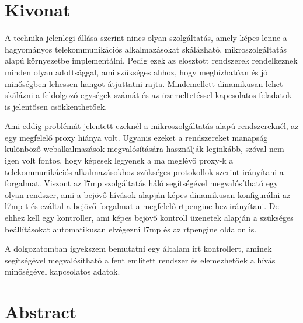 \setcounter{page}{1}

\selecthungarian

\chapter*{Kivonat}

A technika jelenlegi állása szerint nincs olyan szolgáltatás, amely képes lenne a hagyományos telekommunikációs alkalmazásokat skálázható, mikroszolgáltatás alapú környezetbe implementálni. Pedig ezek az elosztott rendszerek rendelkeznek minden olyan adottsággal, ami szükséges ahhoz, hogy megbízhatóan és jó minőségben lehessen hangot átjuttatni rajta. Mindemellett dinamikusan lehet skálázni a feldolgozó egységek számát és az üzemeltetéssel kapcsolatos feladatok is jelentősen csökkenthetőek.

Ami eddig problémát jelentett ezeknél a mikroszolgáltatás alapú rendszereknél, az egy megfelelő proxy hiánya volt. Ugyanis ezeket a rendszereket manapság különböző webalkalmazások megvalósítására használják leginkább, szóval nem igen volt fontos, hogy képesek legyenek a ma meglévő proxy-k a telekommunikációs alkalmazásokhoz szükséges protokollok szerint irányítani a forgalmat. Viszont az l7mp szolgáltatás háló segítségével megvalósítható egy olyan rendszer, ami a bejövő hívások alapján képes dinamikusan konfigurálni az l7mp-t és ezáltal a bejövő forgalmat a megfelelő rtpengine-hez irányítani. De ehhez kell egy kontroller, ami képes bejövő kontroll üzenetek alapján a szükséges beállításokat automatikusan elvégezni l7mp és az rtpengine oldalon is.

A dolgozatomban igyekszem bemutatni egy általam írt kontrollert, aminek segítségével megvalósítható a fent említett rendszer és elemezhetőek a hívás minőségével kapcsolatos adatok.

\vfill
\selectenglish


\chapter*{Abstract}

